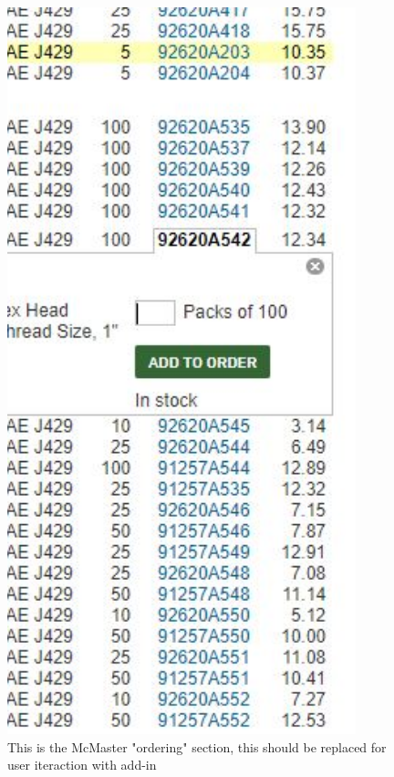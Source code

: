 \documentclass[12pt, letterpaper]{article}
\begin{document}
\begin{figure}[H]
    \centering    
    \begin{minipage}{0.2\textwidth}
        \includegraphics[width=0.9\textwidth]{Figures/webBrowserOld.JPG}
    \end{minipage}
    \caption{This is the McMaster "ordering" section, this should be replaced for user iteraction with add-in}
\end{figure}
\end{document}

